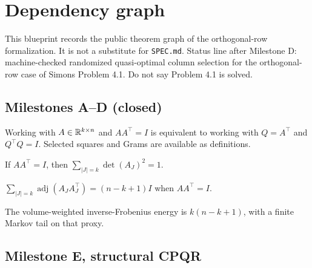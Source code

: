 \chapter{Dependency graph}

This blueprint records the public theorem graph of the orthogonal-row
formalization. It is not a substitute for \texttt{SPEC.md}. Status line
after Milestone D: machine-checked randomized quasi-optimal column
selection for the orthogonal-row case of Simons Problem 4.1. Do not say
Problem 4.1 is solved.

\section{Milestones A--D (closed)}

\begin{theorem}
\label{thm:milestone-a}
\leanok
Working with $A\in\mathbb{R}^{k\times n}$ and $AA^\top=I$ is equivalent to
working with $Q=A^\top$ and $Q^\top Q=I$. Selected squares and Grams are
available as definitions.
\end{theorem}

\begin{theorem}
\label{thm:milestone-b}
\leanok
{}
If $AA^\top=I$, then $\sum_{|J|=k}\det(A_J)^2=1$.
\end{theorem}

\begin{theorem}
\label{thm:milestone-c}
\leanok
{}
$\sum_{|J|=k}\operatorname{adj}(A_J A_J^\top)=(n-k+1)I$ when $AA^\top=I$.
\end{theorem}

\begin{theorem}
\label{thm:milestone-d}
\leanok
{}
The volume-weighted inverse-Frobenius energy is $k(n-k+1)$, with a finite
Markov tail on that proxy.
\end{theorem}

\section{Milestone E, structural CPQR}

